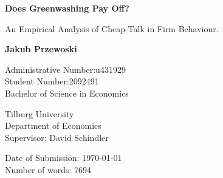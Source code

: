 \begin{titlepage}
    \begin{center}
        \vspace*{1cm}
 
        \Large
        \textbf{Does Greenwashing Pay Off?}
 
        \vspace{0.5cm}
        An Empirical Analysis of Cheap-Talk in Firm Behaviour.
        
        \vspace{1.5cm}
        
        \textbf{Jakub Przewoski}
        
        \vspace{0.5cm}
        \large
        Administrative Number:\@ u431929\\ 
        Student Number:\@ 2092491 \\
        Bachelor of Science in Economics \\
        
        \vfill
        
        Tilburg University\\
        Department of Economics\\
        Supervisor: David Schindler\\
        
        \vspace{0.8cm}
        
        Date of Submission: \today{} \\
        Number of words: 7694

            
    \end{center}
\end{titlepage}
